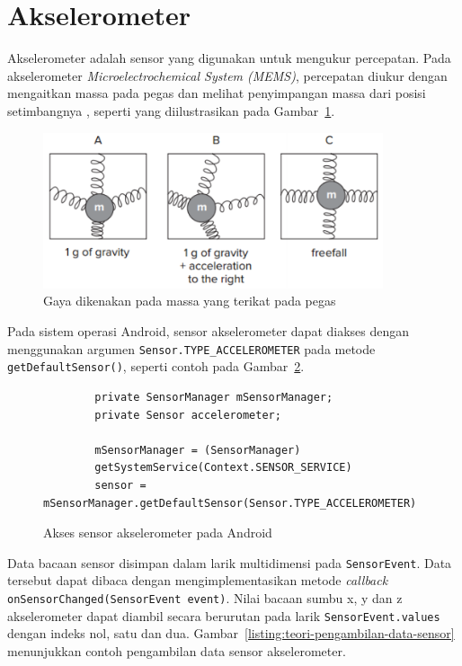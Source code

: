 \section{Akselerometer}
Akselerometer adalah sensor yang digunakan untuk mengukur percepatan. Pada akselerometer \textit{Microelectrochemical System (MEMS)}, percepatan diukur dengan mengaitkan massa pada pegas dan melihat penyimpangan massa dari posisi setimbangnya \citep{milette-2012}, seperti yang diilustrasikan pada Gambar~\ref{gambar:akselerometer-mems}.

\begin{figure}[h!]
    \centering
    \includegraphics[width=10cm]{gambar/landasan-teori/akselerometer-mems.png}
    \caption{Gaya dikenakan pada massa yang terikat pada pegas \citep{milette-2012}}
    \label{gambar:akselerometer-mems}
\end{figure}

Pada sistem operasi Android, sensor akselerometer dapat diakses dengan menggunakan argumen \texttt{Sensor.TYPE_ACCELEROMETER} pada metode \texttt{getDefaultSensor()}, seperti contoh pada Gambar~\ref{listing:teori-akses-akselerometer}.

\begin{figure}[h]
    \begin{verbatim}
        private SensorManager mSensorManager;
        private Sensor accelerometer;

        mSensorManager = (SensorManager)
        getSystemService(Context.SENSOR_SERVICE)
        sensor = mSensorManager.getDefaultSensor(Sensor.TYPE_ACCELEROMETER)
    \end{verbatim}
    \caption{Akses sensor akselerometer pada Android}
    \label{listing:teori-akses-akselerometer}
\end{figure}

Data bacaan sensor disimpan dalam larik multidimensi pada \texttt{SensorEvent}. Data tersebut dapat dibaca dengan mengimplementasikan metode \textit{callback} \linebreak \texttt{onSensorChanged(SensorEvent event)}. Nilai bacaan sumbu x, y dan z akselerometer dapat diambil secara berurutan pada larik \texttt{SensorEvent.values} dengan indeks nol, satu dan dua. Gambar~\ref{listing:teori-pengambilan-data-sensor} menunjukkan contoh pengambilan data sensor akselerometer.

